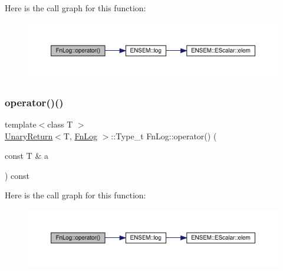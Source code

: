 Here is the call graph for this function\+:
\nopagebreak
\begin{figure}[H]
\begin{center}
\leavevmode
\includegraphics[width=350pt]{d6/d29/structFnLog_a888c66c42f3d71caf35dd0d0cf80d6fb_cgraph}
\end{center}
\end{figure}
\mbox{\label{structFnLog_a888c66c42f3d71caf35dd0d0cf80d6fb}} 
\subsubsection{\texorpdfstring{operator()()}{operator()()}\hspace{0.1cm}{\footnotesize\ttfamily [2/3]}}
{\footnotesize\ttfamily template$<$class T $>$ \\
\mbox{\hyperlink{structUnaryReturn}{Unary\+Return}}$<$T, \mbox{\hyperlink{structFnLog}{Fn\+Log}} $>$\+::Type\+\_\+t Fn\+Log\+::operator() (\begin{DoxyParamCaption}\item[{const T \&}]{a }\end{DoxyParamCaption}) const\hspace{0.3cm}{\ttfamily [inline]}}

Here is the call graph for this function\+:
\nopagebreak
\begin{figure}[H]
\begin{center}
\leavevmode
\includegraphics[width=350pt]{d6/d29/structFnLog_a888c66c42f3d71caf35dd0d0cf80d6fb_cgraph}
\end{center}
\end{figure}
\mbox{\label{structFnLog_a888c66c42f3d71caf35dd0d0cf80d6fb}} 
